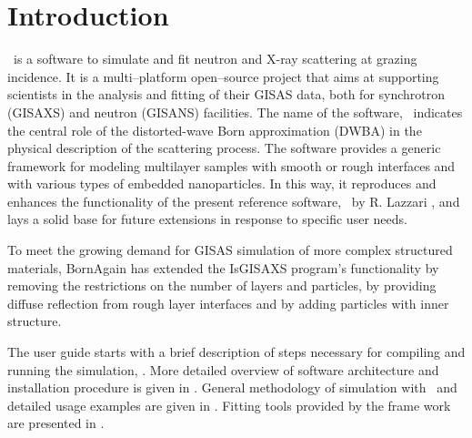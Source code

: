 \newpage
\section{Introduction}

\BornAgain\ is a  software to simulate and fit neutron and X-ray
scattering at grazing incidence. It is a multi–platform open–source project that aims at supporting scientists in the analysis and fitting
of their GISAS data, both for synchrotron (GISAXS) and neutron (GISANS) facilities. The name of the software,
\BornAgain\, indicates the central role of the distorted-wave Born
approximation (DWBA) in the physical description of the
scattering process. The software provides a generic framework for modeling multilayer samples with smooth or
rough interfaces and with various types of embedded nanoparticles. In this way, it reproduces and enhances the
functionality of the present reference software, \IsGISAXS\ by
R. Lazzari \cite{Lazzari:vi0158}, and lays a solid base for future
extensions in response to specific user needs. 

To meet the growing demand for GISAS simulation of more
complex structured materials, BornAgain has extended the IsGISAXS program’s functionality by removing the
restrictions on the number of layers and particles, by providing diffuse reflection from rough layer interfaces and
by adding particles with inner structure.



The user guide starts with a brief description of steps necessary for compiling and running
the simulation, . More detailed overview of software architecture and
installation procedure is given in .
General methodology of simulation with \BornAgain\ and detailed usage examples are given
in .
Fitting tools provided by the frame work are presented in .
\vspace*{2mm}



